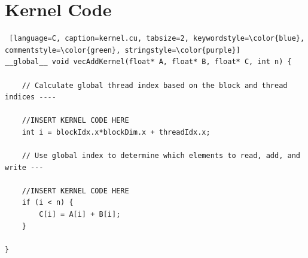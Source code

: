 \documentclass{article}
\begin{document}
\section{Kernel Code}

\begin{lstlisting} [language=C, caption=kernel.cu, tabsize=2, keywordstyle=\color{blue}, commentstyle=\color{green}, stringstyle=\color{purple}]
__global__ void vecAddKernel(float* A, float* B, float* C, int n) {
	
	// Calculate global thread index based on the block and thread indices ----
	
	//INSERT KERNEL CODE HERE
	int i = blockIdx.x*blockDim.x + threadIdx.x;
	
	// Use global index to determine which elements to read, add, and write ---
	
	//INSERT KERNEL CODE HERE
	if (i < n) {
		C[i] = A[i] + B[i];
	}
	
}
\end{lstlisting}
\end{document}
